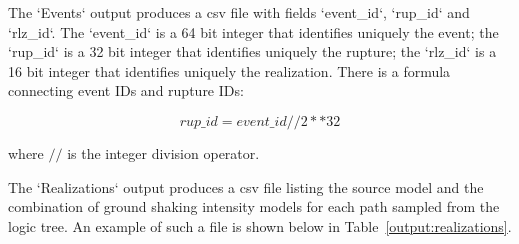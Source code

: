 The `Events` output produces a csv file with fields `event\_id`, `rup\_id`
and `rlz\_id`. The `event\_id` is a 64 bit integer that identifies uniquely
the event; the `rup\_id` is a 32 bit integer that identifies uniquely the
rupture; the `rlz\_id` is a 16 bit integer that identifies uniquely the
realization. There is a formula connecting event IDs and rupture IDs:

$$
rup\_id = event\_ id // 2 ** 32
$$

where $//$ is the integer division operator.

The `Realizations` output produces a csv file listing the source model and the
combination of ground shaking intensity models for each path sampled from the
logic tree. An example of such a file is shown below in
Table~\ref{output:realizations}.


